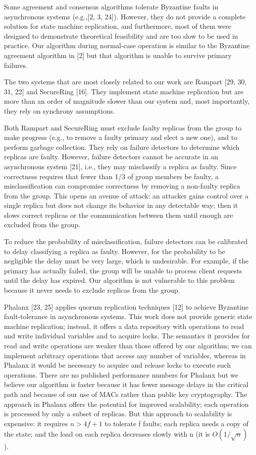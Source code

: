 \documentclass[
]{article}
\begin{document}
Some agreement and consensus algorithms tolerate Byzantine faults in
asynchronous systems (e.g.,{[}2, 3, 24{]}). However, they do not provide
a complete solution for state machine replication, and furthermore, most
of them were designed to demonstrate theoretical feasibility and are too
slow to be used in practice. Our algorithm during normal-case operation
is similar to the Byzantine agreement algorithm in {[}2{]} but that
algorithm is unable to survive primary failures.

The two systems that are most closely related to our work are Rampart
{[}29, 30, 31, 22{]} and SecureRing {[}16{]}. They implement state
machine replication but are more than an order of magnitude slower than
our system and, most importantly, they rely on synchrony assumptions.

Both Rampart and SecureRing must exclude faulty replicas from the group
to make progress (e.g., to remove a faulty primary and elect a new one),
and to perform garbage collection. They rely on failure detectors to
determine which replicas are faulty. However, failure detectors cannot
be accurate in an asynchronous system {[}21{]}, i.e., they may
misclassify a replica as faulty. Since correctness requires that fewer
than 1/3 of group members be faulty, a misclassification can compromise
correctness by removing a non-faulty replica from the group. This opens
an avenue of attack: an attacker gains control over a single replica but
does not change its behavior in any detectable way; then it slows
correct replicas or the communication between them until enough are
excluded from the group.

To reduce the probability of misclassification, failure detectors can be
calibrated to delay classifying a replica as faulty. However, for the
probability to be negligible the delay must be very large, which is
undesirable. For example, if the primary has actually failed, the group
will be unable to process client requests until the delay has expired.
Our algorithm is not vulnerable to this problem because it never needs
to exclude replicas from the group.

Phalanx {[}23, 25{]} applies quorum replication techniques {[}12{]} to
achieve Byzantine fault-tolerance in asynchronous systems. This work
does not provide generic state machine replication; instead, it offers a
data repository with operations to read and write individual variables
and to acquire locks. The semantics it provides for read and write
operations are weaker than those offered by our algorithm; we can
implement arbitrary operations that access any number of variables,
whereas in Phalanx it would be necessary to acquire and release locks to
execute such operations. There are no published performance numbers for
Phalanx but we believe our algorithm is faster because it has fewer
message delays in the critical path and because of our use of MACs
rather than public key cryptography. The approach in Phalanx offers the
potential for improved scalability; each operation is processed by only
a subset of replicas. But this approach to scalability is expensive: it
requires \(n > 4f + 1\) to tolerate f faults; each replica needs a copy
of the state; and the load on each replica decreases slowly with n (it
is \(O(1/\sqrt{n})\) ).
\end{document}
